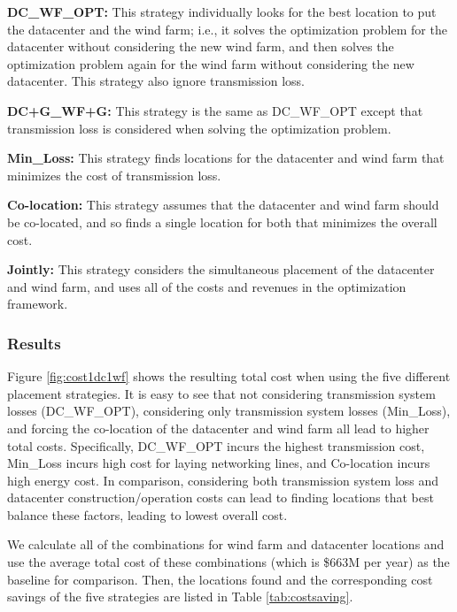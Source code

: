\textbf{DC\_WF\_OPT:} This strategy individually looks for the best location to put the datacenter and the wind farm; i.e., it solves the optimization problem for the datacenter without considering the new wind farm, and then solves the optimization problem again for the wind farm without considering the new datacenter.  This strategy also ignore transmission loss.

\textbf{DC+G\_WF+G:} This strategy is the same as DC\_WF\_OPT except that transmission loss is considered when solving the optimization problem.

\textbf{Min\_Loss:} This strategy finds locations for the datacenter and wind farm that minimizes the cost of transmission loss.

\textbf{Co-location:} This strategy assumes that the datacenter and wind farm
should be co-located, and so finds a single location for both that minimizes the overall cost.

\textbf{Jointly:} This strategy considers the simultaneous placement of the datacenter and wind farm, and uses all of the costs and revenues in the optimization framework.

\subsubsection{Results}
Figure \ref{fig:cost1dc1wf} shows the resulting total cost when using
the five different placement strategies.  It is easy to see that not
considering transmission system losses (DC\_WF\_OPT), considering only
transmission system losses (Min\_Loss), and forcing the co-location of
the datacenter and wind farm all lead to higher total costs.
Specifically, DC\_WF\_OPT incurs the highest transmission cost,
Min\_Loss incurs high cost for laying networking lines, and
Co-location incurs high energy cost.  In comparison, considering both
transmission system loss and datacenter construction/operation costs
can lead to finding locations that best balance these factors, leading
to lowest overall cost.

We calculate all of the combinations for wind farm and datacenter
locations and use the average total cost of these combinations (which
is \$663M per year) as the baseline for comparison. Then, the
locations found and the corresponding cost savings of the five
strategies are listed in Table \ref{tab:costsaving}.

